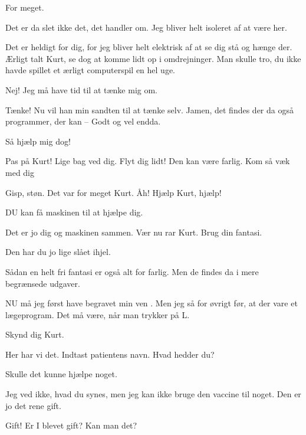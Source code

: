 \documentclass[a4paper,11pt]{article}
\begin{document}
\begin{sketch}
 For meget.

 Det er da slet ikke det, det handler om. Jeg bliver helt isoleret af at
være her.

 Det er heldigt for dig, for jeg bliver helt elektrisk af at se dig stå
og hænge der. Ærligt talt Kurt, se dog at komme lidt op i omdrejninger. Man
skulle tro, du ikke havde spillet et ærligt computerspil en hel uge.

 Nej! Jeg må have tid til at tænke mig om.

 Tænke! Nu vil han min sandten til at tænke selv. Jamen, det findes der
da også programmer, der kan -- Godt og vel endda.

 Så hjælp mig dog!


 Pas på Kurt! Lige bag ved dig.  Flyt
dig lidt! Den kan være farlig. Kom så væk med dig 


 Gisp, støn. Det var for meget Kurt. Åh!  Hjælp Kurt, hjælp!

 DU kan få maskinen til at hjælpe dig.

 Det er jo dig og maskinen sammen. Vær nu rar Kurt. Brug din fantasi.

 Den har du jo lige slået ihjel.

 Sådan en helt fri fantasi er også alt for farlig. Men de findes da i
mere begrænsede udgaver.

 NU må jeg først have begravet min ven . Men jeg så for øvrigt før, at der vare et
lægeprogram.  Det må være, når man trykker på L.

 Skynd dig Kurt.

 Her har vi det. Indtast patientens navn. Hvad hedder du?

  Skulle det kunne hjælpe noget.

 Jeg ved ikke, hvad du synes, men jeg kan ikke bruge den vaccine til
noget. Den er jo det rene gift.

  Gift! Er I blevet gift? Kan man det?


\end{sketch}
\end{document}
